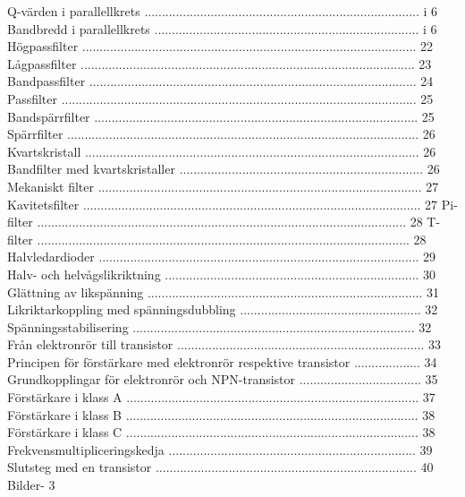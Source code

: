 \documentclass[a4paper,twoside,twocolumn,openright]{book}
\begin{document}
{{{{{{{{{{{Q-värden i parallellkrets ............................................................................... i 6
Bandbredd i parallellkrets ............................................................................ i 6
Högpassfilter ................................................................................................ 22
Lågpassfilter ................................................................................................ 23
Bandpassfilter .............................................................................................. 24
Passfilter ...................................................................................................... 25
Bandspärrfilter ............................................................................................. 25
Spärrfilter ..................................................................................................... 26
Kvartskristall ................................................................................................ 26
Bandfilter med kvartskristaller ...................................................................... 26
Mekaniskt filter ............................................................................................. 27
Kavitetsfilter ................................................................................................. 27
Pi-filter .......................................................................................................... 28
T-filter ........................................................................................................... 28
Halvledardioder ............................................................................................ 29
Halv- och helvågslikriktning ......................................................................... 30
Glättning av likspänning ............................................................................... 31
Likriktarkoppling med spänningsdubbling .................................................... 32
Spänningsstabilisering ................................................................................. 32
Från elektronrör till transistor ....................................................................... 33
Principen för förstärkare med elektronrör respektive transistor ................... 34
Grundkopplingar för elektronrör och NPN-transistor ................................... 35
Förstärkare i klass A .................................................................................... 37
Förstärkare i klass B .................................................................................... 38
Förstärkare i klass C .................................................................................... 38
Frekvensmultipliceringskedja ....................................................................... 39
Slutsteg med en transistor ........................................................................... 40
Bilder- 3

}}}}}}}}}}}
\end{document}

